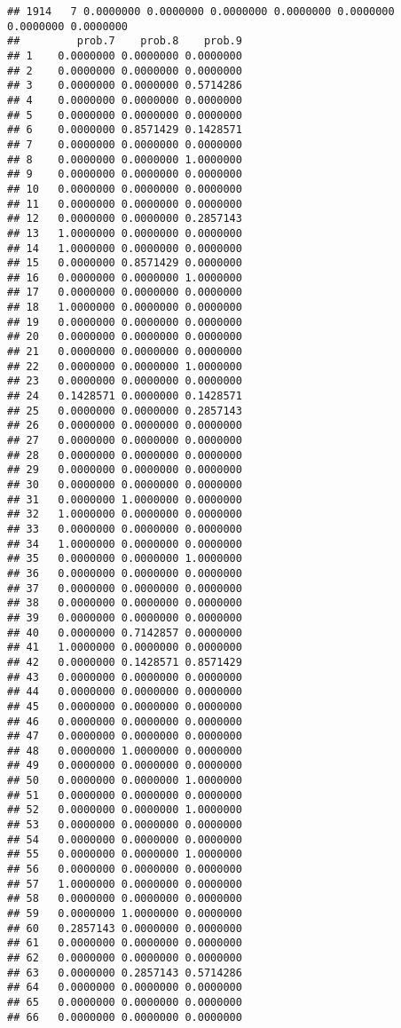 \documentclass[
]{article}
\begin{document}
\begin{verbatim}
## 1914   7 0.0000000 0.0000000 0.0000000 0.0000000 0.0000000 0.0000000 0.0000000
##         prob.7    prob.8    prob.9
## 1    0.0000000 0.0000000 0.0000000
## 2    0.0000000 0.0000000 0.0000000
## 3    0.0000000 0.0000000 0.5714286
## 4    0.0000000 0.0000000 0.0000000
## 5    0.0000000 0.0000000 0.0000000
## 6    0.0000000 0.8571429 0.1428571
## 7    0.0000000 0.0000000 0.0000000
## 8    0.0000000 0.0000000 1.0000000
## 9    0.0000000 0.0000000 0.0000000
## 10   0.0000000 0.0000000 0.0000000
## 11   0.0000000 0.0000000 0.0000000
## 12   0.0000000 0.0000000 0.2857143
## 13   1.0000000 0.0000000 0.0000000
## 14   1.0000000 0.0000000 0.0000000
## 15   0.0000000 0.8571429 0.0000000
## 16   0.0000000 0.0000000 1.0000000
## 17   0.0000000 0.0000000 0.0000000
## 18   1.0000000 0.0000000 0.0000000
## 19   0.0000000 0.0000000 0.0000000
## 20   0.0000000 0.0000000 0.0000000
## 21   0.0000000 0.0000000 0.0000000
## 22   0.0000000 0.0000000 1.0000000
## 23   0.0000000 0.0000000 0.0000000
## 24   0.1428571 0.0000000 0.1428571
## 25   0.0000000 0.0000000 0.2857143
## 26   0.0000000 0.0000000 0.0000000
## 27   0.0000000 0.0000000 0.0000000
## 28   0.0000000 0.0000000 0.0000000
## 29   0.0000000 0.0000000 0.0000000
## 30   0.0000000 0.0000000 0.0000000
## 31   0.0000000 1.0000000 0.0000000
## 32   1.0000000 0.0000000 0.0000000
## 33   0.0000000 0.0000000 0.0000000
## 34   1.0000000 0.0000000 0.0000000
## 35   0.0000000 0.0000000 1.0000000
## 36   0.0000000 0.0000000 0.0000000
## 37   0.0000000 0.0000000 0.0000000
## 38   0.0000000 0.0000000 0.0000000
## 39   0.0000000 0.0000000 0.0000000
## 40   0.0000000 0.7142857 0.0000000
## 41   1.0000000 0.0000000 0.0000000
## 42   0.0000000 0.1428571 0.8571429
## 43   0.0000000 0.0000000 0.0000000
## 44   0.0000000 0.0000000 0.0000000
## 45   0.0000000 0.0000000 0.0000000
## 46   0.0000000 0.0000000 0.0000000
## 47   0.0000000 0.0000000 0.0000000
## 48   0.0000000 1.0000000 0.0000000
## 49   0.0000000 0.0000000 0.0000000
## 50   0.0000000 0.0000000 1.0000000
## 51   0.0000000 0.0000000 0.0000000
## 52   0.0000000 0.0000000 1.0000000
## 53   0.0000000 0.0000000 0.0000000
## 54   0.0000000 0.0000000 0.0000000
## 55   0.0000000 0.0000000 1.0000000
## 56   0.0000000 0.0000000 0.0000000
## 57   1.0000000 0.0000000 0.0000000
## 58   0.0000000 0.0000000 0.0000000
## 59   0.0000000 1.0000000 0.0000000
## 60   0.2857143 0.0000000 0.0000000
## 61   0.0000000 0.0000000 0.0000000
## 62   0.0000000 0.0000000 0.0000000
## 63   0.0000000 0.2857143 0.5714286
## 64   0.0000000 0.0000000 0.0000000
## 65   0.0000000 0.0000000 0.0000000
## 66   0.0000000 0.0000000 0.0000000

\end{verbatim}
\end{document}
